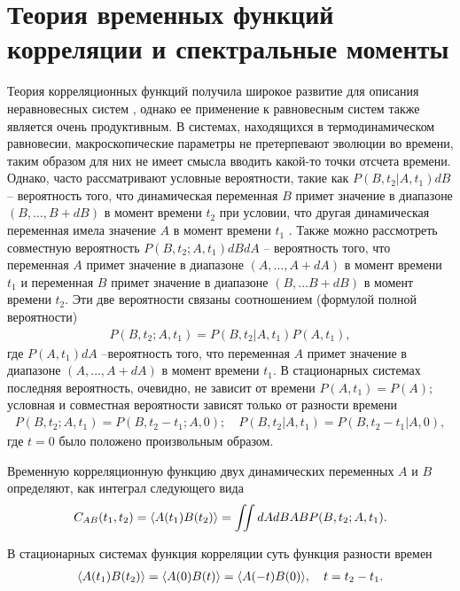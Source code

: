 \section{Теория временных функций корреляции и спектральные моменты} \label{section:correlation_functions}

Теория корреляционных функций получила широкое развитие для описания неравновесных систем \cite{zwanzig1965}, однако ее применение к равновесным систем также является очень продуктивным. В системах, находящихся в термодинамическом равновесии, макроскопические параметры не претерпевают эволюции во времени, таким образом для них не имеет смысла вводить какой-то точки отсчета времени. Однако, часто рассматривают условные вероятности, такие как $P(B, t_2 \vert A, t_1) dB$ -- вероятность того, что динамическая переменная $B$ примет значение в диапазоне $(B, \dots, B + dB)$ в момент времени $t_2$ при условии, что другая динамическая переменная имела значение $A$ в момент времени $t_1$ \cite{nitzan2006}. Также можно рассмотреть совместную вероятность $P(B, t_2; A, t_1) dB dA$ -- вероятность того, что переменная $A$ примет значение в диапазоне $(A, \dots, A+dA)$ в момент времени $t_1$ и переменная $B$ примет значение в диапазоне $(B, \dots B+dB)$ в момент времени $t_2$. Эти две вероятности связаны соотношением (формулой полной вероятности)
\begin{gather}
    P(B, t_2; A, t_1) = P(B, t_2 \vert A, t_1) P(A, t_1), 
\end{gather}
где $P(A, t_1) dA$ --вероятность того, что переменная $A$ примет значение в диапазоне $(A, \dots, A+dA)$ в момент времени $t_1$. В стационарных системах последняя вероятность, очевидно, не зависит от времени $P(A, t_1) = P(A)$; условная и совместная вероятности зависят только от разности времени
\begin{gather}
    P(B, t_2; A, t_1) = P(B, t_2 - t_1; A, 0); \quad P(B, t_2 \vert A, t_1) = P(B, t_2 - t_1 \vert A, 0),
\end{gather}
%
где $t = 0$ было положено произвольным образом.\par
Временную корреляционную функцию двух динамических переменных $A$ и $B$ определяют, как интеграл следующего вида 
\begin{gather}
    C_{AB}(t_1, t_2) = \langle  A(t_1) B(t_2)  \rangle = \iint dA dB AB P(B, t_2; A, t_1). \label{part1-correlation-function-definition}
\end{gather}

В стационарных системах функция корреляции суть функция разности времен
\begin{gather}
    \langle  A(t_1) B(t_2)  \rangle = \langle  A(0) B(t)  \rangle = \langle  A(-t) B(0)  \rangle, \quad t = t_2 - t_1.
\end{gather}

